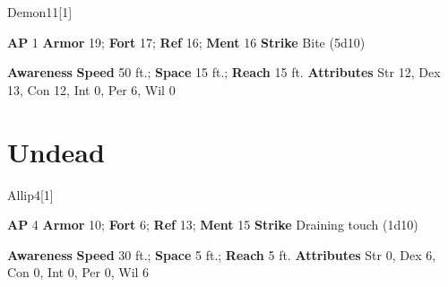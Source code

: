 \begin{monsection}[Bebelith]{Demon}{11}[1]
\vspace{-1em}\vspace{-1em}
\begin{spellcontent}
\begin{spelltargetinginfo}
{\textbf{AP} 1}
\pari \textbf{Armor} 19;
\textbf{Fort} 17;
\textbf{Ref} 16;
\textbf{Ment} 16
\pari \textbf{Strike} Bite  (5d10)
\end{spelltargetinginfo}
\end{spellcontent}
\begin{spellsubcontent}
\begin{spellfooter}
\pari \textbf{Awareness} 
\pari \textbf{Speed} 50 ft.;
\textbf{Space} 15 ft.;
\textbf{Reach} 15 ft.
\pari \textbf{Attributes}
Str 12,
Dex 13,
Con 12,
Int 0,
Per 6,
Wil 0
\end{spellfooter}
\end{spellsubcontent}
\end{monsection}
\section{Undead}
\begin{monsection}{Allip}{4}[1]
\vspace{-1em}\vspace{-1em}
\begin{spellcontent}
\begin{spelltargetinginfo}
{\textbf{AP} 4}
\pari \textbf{Armor} 10;
\textbf{Fort} 6;
\textbf{Ref} 13;
\textbf{Ment} 15
\pari \textbf{Strike} Draining touch  (1d10)
\end{spelltargetinginfo}
\end{spellcontent}
\begin{spellsubcontent}
\begin{spellfooter}
\pari \textbf{Awareness} 
\pari \textbf{Speed} 30 ft.;
\textbf{Space} 5 ft.;
\textbf{Reach} 5 ft.
\pari \textbf{Attributes}
Str 0,
Dex 6,
Con 0,
Int 0,
Per 0,
Wil 6
\end{spellfooter}
\end{spellsubcontent}
\end{monsection}